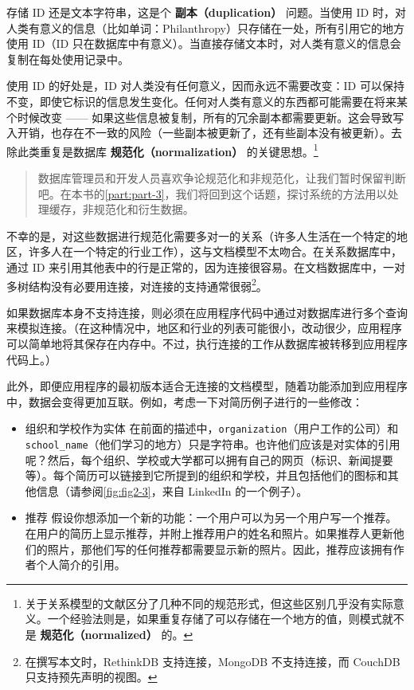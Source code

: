 存储 ID 还是文本字符串，这是个 \textbf{副本（duplication）} 问题。当使用 ID 时，对人类有意义的信息（比如单词：Philanthropy）只存储在一处，所有引用它的地方使用 ID（ID 只在数据库中有意义）。当直接存储文本时，对人类有意义的信息会复制在每处使用记录中。

使用 ID 的好处是，ID 对人类没有任何意义，因而永远不需要改变：ID 可以保持不变，即使它标识的信息发生变化。任何对人类有意义的东西都可能需要在将来某个时候改变 —— 如果这些信息被复制，所有的冗余副本都需要更新。这会导致写入开销，也存在不一致的风险（一些副本被更新了，还有些副本没有被更新）。去除此类重复是数据库 \textbf{规范化（normalization）} 的关键思想。\footnote{关于关系模型的文献区分了几种不同的规范形式，但这些区别几乎没有实际意义。一个经验法则是，如果重复存储了可以存储在一个地方的值，则模式就不是 \textbf{规范化（normalized）} 的。}

\begin{quote}
    数据库管理员和开发人员喜欢争论规范化和非规范化，让我们暂时保留判断吧。在本书的\autoref{part:part-3}，我们将回到这个话题，探讨系统的方法用以处理缓存，非规范化和衍生数据。
\end{quote}

不幸的是，对这些数据进行规范化需要多对一的关系（许多人生活在一个特定的地区，许多人在一个特定的行业工作），这与文档模型不太吻合。在关系数据库中，通过 ID 来引用其他表中的行是正常的，因为连接很容易。在文档数据库中，一对多树结构没有必要用连接，对连接的支持通常很弱\footnote{在撰写本文时，RethinkDB 支持连接，MongoDB 不支持连接，而 CouchDB 只支持预先声明的视图。}。

如果数据库本身不支持连接，则必须在应用程序代码中通过对数据库进行多个查询来模拟连接。（在这种情况中，地区和行业的列表可能很小，改动很少，应用程序可以简单地将其保存在内存中。不过，执行连接的工作从数据库被转移到应用程序代码上。）

此外，即便应用程序的最初版本适合无连接的文档模型，随着功能添加到应用程序中，数据会变得更加互联。例如，考虑一下对简历例子进行的一些修改：

\begin{itemize}
    \item 组织和学校作为实体
          在前面的描述中，\texttt{organization}（用户工作的公司）和 \texttt{school\_name}（他们学习的地方）只是字符串。也许他们应该是对实体的引用呢？然后，每个组织、学校或大学都可以拥有自己的网页（标识、新闻提要等）。每个简历可以链接到它所提到的组织和学校，并且包括他们的图标和其他信息（请参阅\autoref{fig:fig2-3}，来自 LinkedIn 的一个例子）。
    \item 推荐
          假设你想添加一个新的功能：一个用户可以为另一个用户写一个推荐。在用户的简历上显示推荐，并附上推荐用户的姓名和照片。如果推荐人更新他们的照片，那他们写的任何推荐都需要显示新的照片。因此，推荐应该拥有作者个人简介的引用。
\end{itemize}

